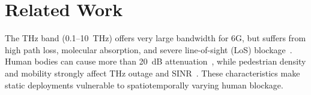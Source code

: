 \documentclass[conference]{IEEEtran}
\begin{document}
	
		
		
	
	
	\section{Related Work}
	
	The THz band (0.1--10~THz) offers very large bandwidth for 6G, but
	suffers from high path loss, molecular absorption, and severe
	line-of-sight (LoS) blockage~\cite{b5,b1,b2}. Human bodies can cause
	more than 20~dB attenuation~\cite{b6}, while pedestrian density and
	mobility strongly affect THz outage and SINR~\cite{b3,b14}. These
	characteristics make static deployments vulnerable to
	spatiotemporally varying human blockage.
	
\end{document}
